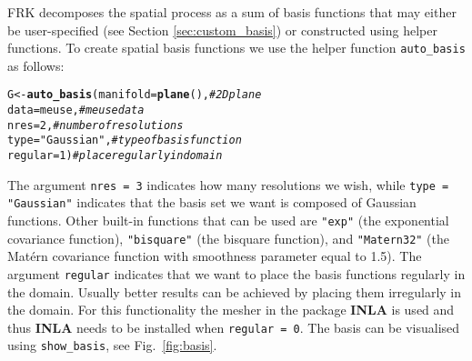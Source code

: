 \documentclass{article}\usepackage[]{graphicx}\usepackage[]{color}
\makeatletter
\newcommand{\hlnum}[1]{\textcolor[rgb]{0.686,0.059,0.569}{#1}}%
\newcommand{\hlstr}[1]{\textcolor[rgb]{0.192,0.494,0.8}{#1}}%
\newcommand{\hlcom}[1]{\textcolor[rgb]{0.678,0.584,0.686}{\textit{#1}}}%
\newcommand{\hlstd}[1]{\textcolor[rgb]{0.345,0.345,0.345}{#1}}%
\newcommand{\hlkwb}[1]{\textcolor[rgb]{0.69,0.353,0.396}{#1}}%
\newcommand{\hlkwc}[1]{\textcolor[rgb]{0.333,0.667,0.333}{#1}}%
\newcommand{\hlkwd}[1]{\textcolor[rgb]{0.737,0.353,0.396}{\textbf{#1}}}%
\newenvironment{kframe}{%
 \def\at@end@of@kframe{}%
 \ifinner\ifhmode%
  \def\at@end@of@kframe{\end{minipage}}%
  \begin{minipage}{\columnwidth}%
 \fi\fi%
 \def\FrameCommand##1{\hskip\@totalleftmargin \hskip-\fboxsep
 \colorbox{shadecolor}{##1}\hskip-\fboxsep
     \hskip-\linewidth \hskip-\@totalleftmargin \hskip\columnwidth}%
 \MakeFramed {\advance\hsize-\width
   \@totalleftmargin\z@ \linewidth\hsize
   \@setminipage}}%
 {\par\unskip\endMakeFramed%
 \at@end@of@kframe}
\newenvironment{knitrout}{}{} %
\renewcommand{\tt} {\texttt}
\newcommand{\pkg}[1]{{\fontseries{b}\selectfont #1}}
\makeatother
\begin{document}
\vspace{0.1in}

 \pkg{FRK} decomposes the spatial process as a sum of basis functions that may either be user-specified (see Section \ref{sec:custom_basis}) or constructed using helper functions. To create spatial basis functions we use the helper function \tt{auto\_basis} as follows:

\begin{knitrout}
\color{fgcolor}\begin{kframe}
\begin{alltt}
\hlstd{G} \hlkwb{<-} \hlkwd{auto_basis}\hlstd{(}\hlkwc{manifold} \hlstd{=} \hlkwd{plane}\hlstd{(),}   \hlcom{# 2D plane}
                \hlkwc{data}\hlstd{=meuse,}           \hlcom{# meuse data}
                \hlkwc{nres} \hlstd{=} \hlnum{2}\hlstd{,}             \hlcom{# number of resolutions}
                \hlkwc{type} \hlstd{=} \hlstr{"Gaussian"}\hlstd{,}    \hlcom{# type of basis function}
                \hlkwc{regular} \hlstd{=} \hlnum{1}\hlstd{)}          \hlcom{# place regularly in domain}
\end{alltt}
\end{kframe}
\end{knitrout}

\noindent The argument \tt{nres = 3} indicates how many resolutions we wish, while \tt{type = "Gaussian"} indicates that the basis set we want is composed of Gaussian functions. Other built-in functions that can be used are \tt{"exp"} (the exponential covariance function), \tt{"bisquare"} (the bisquare function), and \tt{"Matern32"} (the Mat{\'e}rn covariance function with smoothness parameter equal to 1.5). The argument \tt{regular} indicates that we want to place the basis functions regularly in the domain. Usually better results can be achieved by placing them irregularly in the domain. For this functionality the mesher in the package {\bf INLA} is used and thus {\bf INLA} needs to be installed when \tt{regular = 0}. The basis can be visualised using \tt{show\_basis}, see Fig.~\ref{fig:basis}.
\end{document}

